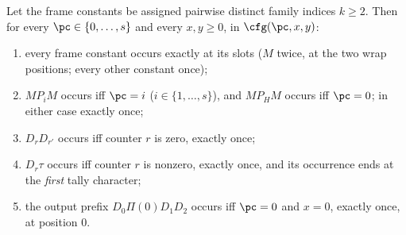 \begin{lemma}[occurrence]\label{lem:occurrence}
Let the frame constants be assigned pairwise distinct family indices
$k\ge 2$.  Then for every $\pc\in\{0,\dots,s\}$ and every $x,y\ge 0$,
in $\cfg(\pc,x,y)$:
\begin{enumerate}
\item[(i)] every frame constant occurs exactly at its slots ($M$
      twice, at the two wrap positions; every other constant once);
\item[(ii)] $M P_i M$ occurs iff $\pc=i$ ($i\in\{1,\dots,s\}$), and
      $M P_H M$ occurs iff $\pc=0$; in either case exactly once;
\item[(iii)] $D_rD_{r'}$ occurs iff counter $r$ is zero, exactly once;
\item[(iv)] $D_r\tau$ occurs iff counter $r$ is nonzero, exactly
      once, and its occurrence ends at the \emph{first} tally
      character;
\item[(v)] the output prefix $D_0\Pi(0)D_1D_2$ occurs iff $\pc=0$ and
      $x=0$, exactly once, at position $0$.
\end{enumerate}
\end{lemma}

